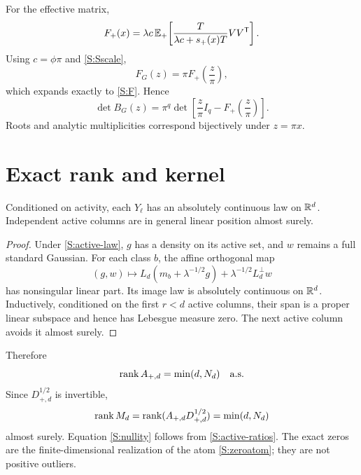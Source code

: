 For the effective matrix,
\begin{equation}
F_+(x)=
\lambda c\,\mathbb{E}_+\!\left[
\frac{T}{\lambda c+s_+(x)T}VV^{\mathsf T}
\right].
\end{equation}
Using $c=\phi\pi$ and \eqref{S:Sscale},
\begin{equation}
F_G(z)=\pi F_+\!\left(\frac z\pi\right),
\label{S:Fscale}
\end{equation}
which expands exactly to \eqref{S:F}. Hence
\begin{equation}
\det B_G(z)
=
\pi^q\det\!\left[
\frac z\pi I_q-F_+\!\left(\frac z\pi\right)
\right].
\label{S:detscale}
\end{equation}
Roots and analytic multiplicities correspond bijectively under $z=\pi x$.

\section{Exact rank and kernel}

\begin{lemma}
Conditioned on activity, each $Y_\ell$ has an absolutely continuous law on $\mathbb{R}^d$. Independent active columns are in general linear position almost surely.
\end{lemma}

\begin{proof}
Under \eqref{S:active-law}, $g$ has a density on its active set, and $w$ remains a full standard Gaussian. For each class $b$, the affine orthogonal map
\begin{equation}
(g,w)\mapsto
L_d(m_b+\lambda^{-1/2}g)
+\lambda^{-1/2}L_d^\perp w
\end{equation}
has nonsingular linear part. Its image law is absolutely continuous on $\mathbb{R}^d$. Inductively, conditioned on the first $r<d$ active columns, their span is a proper linear subspace and hence has Lebesgue measure zero. The next active column avoids it almost surely.
\end{proof}

Therefore
\begin{equation}
\operatorname{rank} A_{+,d}=\min(d,N_d)\quad\text{a.s.}
\end{equation}
Since $D_{+,d}^{1/2}$ is invertible,
\begin{equation}
\operatorname{rank} M_d
=\operatorname{rank}(A_{+,d}D_{+,d}^{1/2})
=\min(d,N_d)
\end{equation}
almost surely. Equation \eqref{S:nullity} follows from \eqref{S:active-ratios}. The exact zeros are the finite-dimensional realization of the atom \eqref{S:zeroatom}; they are not positive outliers.

